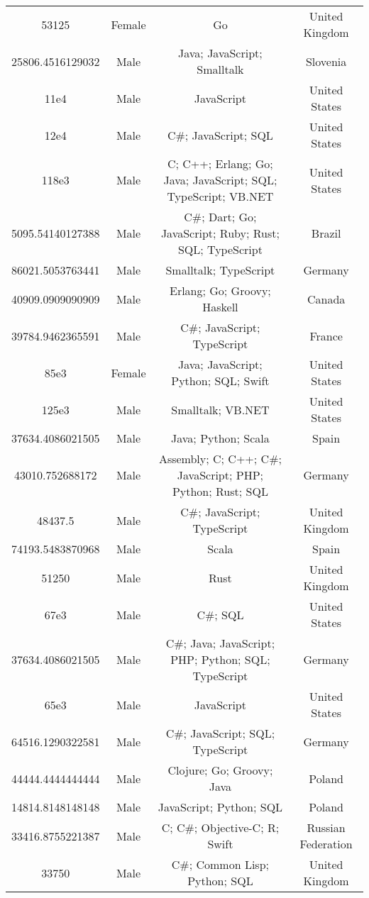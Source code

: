 \begin{center}
\begin{tabular}{ |c|c|c|c| }
53125  &  Female  &  Go  &  United Kingdom  \\ 
25806.4516129032  &  Male  &  Java; JavaScript; Smalltalk  &  Slovenia  \\ 
11e4  &  Male  &  JavaScript  &  United States  \\ 
12e4  &  Male  &  C\#; JavaScript; SQL  &  United States  \\ 
118e3  &  Male  &  C; C++; Erlang; Go; Java; JavaScript; SQL; TypeScript; VB.NET  &  United States  \\ 
5095.54140127388  &  Male  &  C\#; Dart; Go; JavaScript; Ruby; Rust; SQL; TypeScript  &  Brazil  \\ 
86021.5053763441  &  Male  &  Smalltalk; TypeScript  &  Germany  \\ 
40909.0909090909  &  Male  &  Erlang; Go; Groovy; Haskell  &  Canada  \\ 
39784.9462365591  &  Male  &  C\#; JavaScript; TypeScript  &  France  \\ 
85e3  &  Female  &  Java; JavaScript; Python; SQL; Swift  &  United States  \\ 
125e3  &  Male  &  Smalltalk; VB.NET  &  United States  \\ 
37634.4086021505  &  Male  &  Java; Python; Scala  &  Spain  \\ 
43010.752688172  &  Male  &  Assembly; C; C++; C\#; JavaScript; PHP; Python; Rust; SQL  &  Germany  \\ 
48437.5  &  Male  &  C\#; JavaScript; TypeScript  &  United Kingdom  \\ 
74193.5483870968  &  Male  &  Scala  &  Spain  \\ 
51250  &  Male  &  Rust  &  United Kingdom  \\ 
67e3  &  Male  &  C\#; SQL  &  United States  \\ 
37634.4086021505  &  Male  &  C\#; Java; JavaScript; PHP; Python; SQL; TypeScript  &  Germany  \\ 
65e3  &  Male  &  JavaScript  &  United States  \\ 
64516.1290322581  &  Male  &  C\#; JavaScript; SQL; TypeScript  &  Germany  \\ 
44444.4444444444  &  Male  &  Clojure; Go; Groovy; Java  &  Poland  \\ 
14814.8148148148  &  Male  &  JavaScript; Python; SQL  &  Poland  \\ 
33416.8755221387  &  Male  &  C; C\#; Objective-C; R; Swift  &  Russian Federation  \\ 
33750  &  Male  &  C\#; Common Lisp; Python; SQL  &  United Kingdom  \\ 

\end{tabular}
\end{center}
